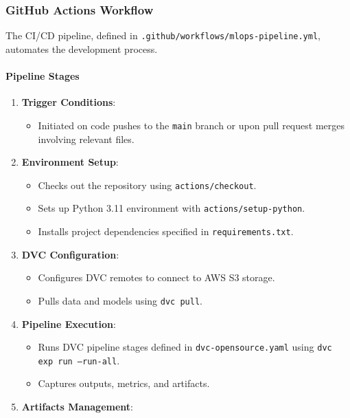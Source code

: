 \documentclass{article}
\begin{document}
\subsubsection{GitHub Actions Workflow}

The CI/CD pipeline, defined in \texttt{.github/workflows/mlops-pipeline.yml}, automates the development process.

\paragraph{Pipeline Stages}

\begin{enumerate}[leftmargin=*]
    \item \textbf{Trigger Conditions}:
        \begin{itemize}[leftmargin=*]
            \item Initiated on code pushes to the \texttt{main} branch or upon pull request merges involving relevant files.
        \end{itemize}
    \item \textbf{Environment Setup}:
        \begin{itemize}[leftmargin=*]
            \item Checks out the repository using \texttt{actions/checkout}.
            \item Sets up Python 3.11 environment with \texttt{actions/setup-python}.
            \item Installs project dependencies specified in \texttt{requirements.txt}.
        \end{itemize}
    \item \textbf{DVC Configuration}:
        \begin{itemize}[leftmargin=*]
            \item Configures DVC remotes to connect to AWS S3 storage.
            \item Pulls data and models using \texttt{dvc pull}.
        \end{itemize}
    \item \textbf{Pipeline Execution}:
        \begin{itemize}[leftmargin=*]
            \item Runs DVC pipeline stages defined in \texttt{dvc-opensource.yaml} using \texttt{dvc exp run --run-all}.
            \item Captures outputs, metrics, and artifacts.
        \end{itemize}
    \item \textbf{Artifacts Management}:

\end{enumerate}
\end{document}

